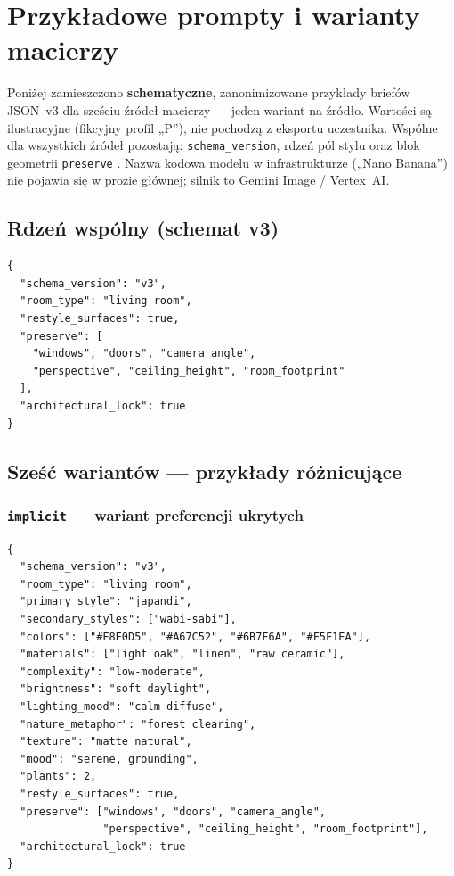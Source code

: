 \chapter{Przykładowe prompty i warianty macierzy}
\label{app:d:top}

Poniżej zamieszczono \textbf{schematyczne}, zanonimizowane przykłady briefów JSON~v3 dla sześciu źródeł macierzy --- jeden wariant na źródło. Wartości są ilustracyjne (fikcyjny profil „P”), nie pochodzą z eksportu uczestnika. Wspólne dla wszystkich źródeł pozostają: \texttt{schema\_version}, rdzeń pól stylu oraz blok geometrii \texttt{preserve} \parencite{idaPlatform2026}. Nazwa kodowa modelu w infrastrukturze („Nano Banana”) nie pojawia się w prozie głównej; silnik to Gemini Image / Vertex~AI.

\section{Rdzeń wspólny (schemat v3)}
\label{app:d:sec:rdzen}

\begin{lstlisting}[caption={Wspólny szkielet briefu JSON v3 (pola geometrii identyczne we wszystkich źródłach).},label={lst:app:d:core}]
{
  "schema_version": "v3",
  "room_type": "living room",
  "restyle_surfaces": true,
  "preserve": [
    "windows", "doors", "camera_angle",
    "perspective", "ceiling_height", "room_footprint"
  ],
  "architectural_lock": true
}
\end{lstlisting}

\section{Sześć wariantów --- przykłady różnicujące}
\label{app:d:sec:szesc}

\subsection{\texttt{implicit} --- wariant preferencji ukrytych}
\label{app:d:sec:implicit}

\begin{lstlisting}
{
  "schema_version": "v3",
  "room_type": "living room",
  "primary_style": "japandi",
  "secondary_styles": ["wabi-sabi"],
  "colors": ["#E8E0D5", "#A67C52", "#6B7F6A", "#F5F1EA"],
  "materials": ["light oak", "linen", "raw ceramic"],
  "complexity": "low-moderate",
  "brightness": "soft daylight",
  "lighting_mood": "calm diffuse",
  "nature_metaphor": "forest clearing",
  "texture": "matte natural",
  "mood": "serene, grounding",
  "plants": 2,
  "restyle_surfaces": true,
  "preserve": ["windows", "doors", "camera_angle",
               "perspective", "ceiling_height", "room_footprint"],
  "architectural_lock": true
}
\end{lstlisting}

